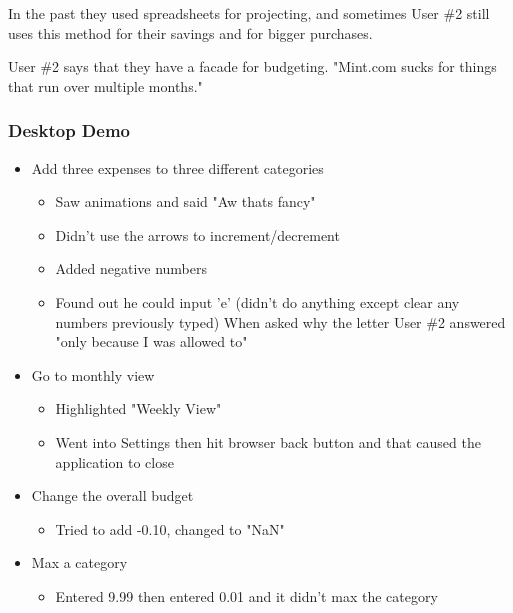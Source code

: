 \documentclass{chi2011}
\begin{document}
\begin{itemize}[noitemsep]
\begin{itemize}[noitemsep]
\begin{itemize}[noitemsep]
				In the past they used spreadsheets for projecting, and sometimes User \#2 still uses this
				method for their savings and for bigger purchases. 
				
				User \#2 says that they have a facade for budgeting. "Mint.com sucks for things that run over
				multiple months."
		\end{itemize}
	\end{itemize}
	
	\subsubsection{Desktop Demo}
	\begin{itemize}[noitemsep] 
		\item Add three expenses to three different categories
		\begin{itemize}[noitemsep]
			\item Saw animations and said "Aw thats fancy"
			\item Didn't use the arrows to increment/decrement
			\item Added negative numbers
			\item Found out he could input 'e' (didn't do anything except clear any numbers previously 
			typed) When asked why the letter User \#2 answered "only because I was allowed to"
		\end{itemize}
		\item Go to monthly view
		\begin{itemize}[noitemsep]
			\item Highlighted "Weekly View"
			\item Went into Settings then hit browser back button and that caused the application to close
		\end{itemize}
		\item Change the overall budget
		\begin{itemize}[noitemsep]
			\item Tried to add -0.10, changed to "NaN"
		\end{itemize}
		\item Max a category
		\begin{itemize}[noitemsep]
			\item Entered 9.99 then entered 0.01 and it didn't max the category
		\end{itemize}
	\end{itemize}
	

\end{itemize}
\end{document}
